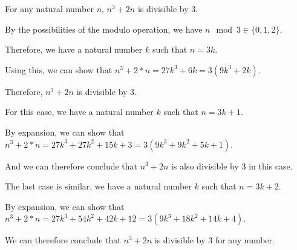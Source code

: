 For any natural number $n$, $n^3 + 2n$ is divisible by $3$.

By the possibilities of the modulo operation, we have $n \mod 3 \in \{0, 1, 2\}$.

Therefore, we have a natural number $k$ such that $n = 3k$.

Using this, we can show that $n^3 + 2*n = 27k^3 + 6k = 3(9k^3+2k)$.

Therefore, $n^3 + 2n$ is divisible by $3$.

For this case, we have a natural number $k$ such that $n = 3k + 1$.

By expansion, we can show that $n^3 + 2*n = 27k^3 + 27k^2 + 15k + 3 = 3(9k^3 + 9k^2 + 5k + 1)$.

And we can therefore conclude that $n^3 + 2n$ is also divisible by $3$ in this case.

The last case is similar, we have a natural number $k$ such that $n = 3k + 2$.

By expansion, we can show that $n^3 + 2*n = 27k^3 + 54k^2 + 42k + 12 = 3(9k^3 + 18k^2 + 14k + 4)$.

We can therefore conclude that $n^3 + 2n$ is divisible by $3$ for any number.